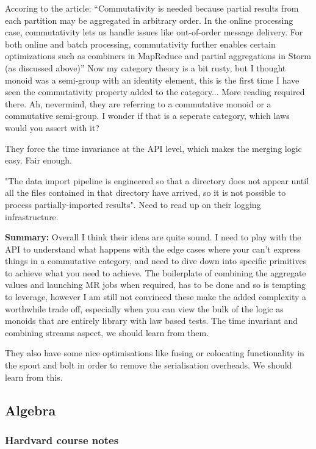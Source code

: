 \documentclass{article}
\begin{document}
Accoring to the article: ``Commutativity is needed because partial results from each partition may be aggregated in arbitrary order.
In the online processing case, commutativity lets us handle issues like out-of-order message delivery. For both online and batch processing, commutativity further enables certain optimizations such as combiners in MapReduce and partial aggregations in Storm (as discussed above)'' Now my category theory is a bit rusty, but I thought monoid was a semi-group with an identity element, this is the first time I have seen the commutativity property added to the category... More reading required there. Ah, nevermind, they are referring to a commutative monoid or a commutative semi-group. I wonder if that is a seperate category, which laws would you assert with it? 

They force the time invariance at the API level, which makes the merging logic easy. Fair enough. 

"The data import pipeline is engineered so that a directory does not appear until all the files contained in that directory have arrived, so it is not possible to process partially-imported results". Need to read up on their logging infrastructure.

\textbf{Summary:} Overall I think their ideas are quite sound. I need to play with the API to understand what happens with the edge cases where your can't express things in a commutative category, and need to dive down into specific primitives to achieve what you need to achieve. The boilerplate of combining the aggregate values and launching MR jobs when required, has to be done and so is tempting to leverage, however I am still not convinced these make the added complexity a worthwhile trade off, especially when you can view the bulk of the logic as monoids that are entirely library with law based tests. The time invariant and combining streams aspect, we should learn from them.

They also have some nice optimisations like fusing or colocating functionality in the spout and bolt in order to remove the serialisation overheads. We should learn from this.

\subsection{Algebra}

\subsubsection{Hardvard course notes}
\end{document}
